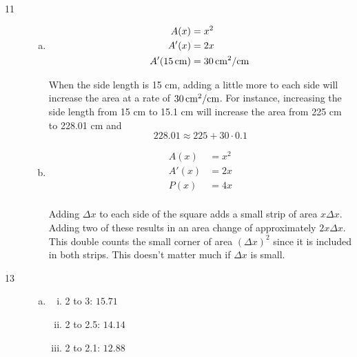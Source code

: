 \documentclass[letterpaper, landscape]{exam}
\begin{document}
\begin{description}
\begin{enumerate}[(a)]
      \end{enumerate}

    \item[11]
      \begin{enumerate}[(a)]
        \item 
          \begin{align*}
            A(x)              & = x^2 \\
            A'(x)             & = 2x \\
            A'(\unit[15]{cm}) & = \unit[\unit[30]{cm^2/cm}]{} \\
          \end{align*}

          When the side length is 15 cm, adding a little more to each side will increase the area at
          a rate of $\unit[30]{cm^2/cm}$. For instance, increasing the side length from 15 cm to
          15.1 cm will increase the area from 225 cm to 228.01 cm and 
          \[
            228.01 \approx 225 + 30 \cdot 0.1 
          \]
          
        \item
          \begin{align*}
            A(x)  & = x^2 \\
            A'(x) & = 2x \\
            P(x)  & = 4x \\
          \end{align*}

          Adding $\Delta x$ to each side of the square adds a small strip of area $x \Delta x$.
          Adding two of these results in an area change of approximately $2 x \Delta x$. This
          double counts the small corner of area $(\Delta x)^2$ since it is included in both strips.
          This doesn't matter much if $\Delta x$ is small.

      \end{enumerate}

    \item[13]
      \begin{enumerate}[(a)]
        \item 
          \begin{enumerate}[(i)]
            \item 2 to 3: $15.71$
            \item 2 to 2.5: $14.14$
            \item 2 to 2.1: $12.88$
          \end{enumerate}


\end{enumerate}
\end{description}
\end{document}
